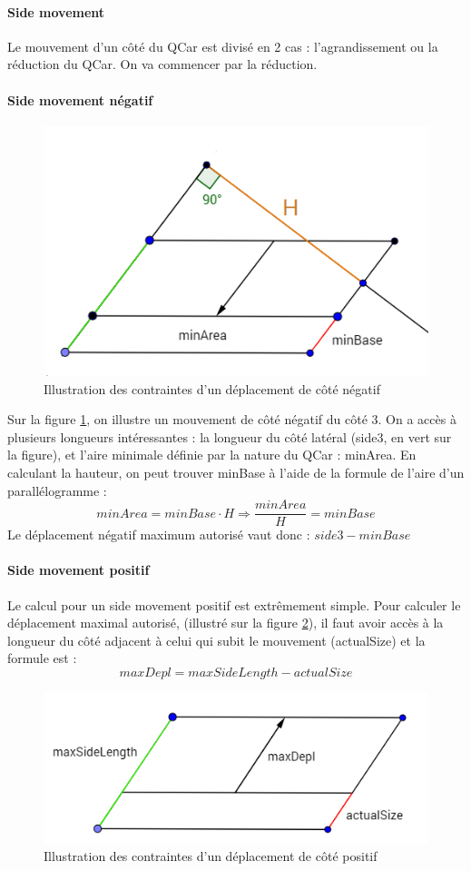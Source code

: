 \documentclass[a4paper, 12pt]{article}
\begin{document}
 \paragraph{Side movement} Le mouvement d'un côté du QCar est divisé en 2 cas : l'agrandissement  ou la réduction du QCar. On va commencer par la réduction. 
 \paragraph{Side movement négatif}
 \begin{figure}[h!]
\centering
\includegraphics[width=0.6\linewidth]{includes/images/QCar_reduc}
\caption{Illustration des contraintes d'un déplacement de côté négatif}
\label{fig:qcarreduc}
\end{figure}
Sur la figure \ref{fig:qcarreduc}, on illustre un mouvement de côté négatif du côté 3. On a accès à plusieurs longueurs intéressantes : la longueur du côté latéral (side3, en vert sur la figure), et l'aire minimale définie par la nature du QCar : minArea. En calculant la hauteur, on peut trouver minBase à l'aide de la formule de l'aire d'un parallélogramme :
\[minArea = minBase \cdot H  \Rightarrow \frac{minArea}{H} = minBase \]
Le déplacement négatif maximum autorisé vaut donc : $side3 - minBase$
\paragraph{Side movement positif} Le calcul pour un side movement positif est extrêmement simple. Pour calculer le déplacement maximal autorisé, (illustré sur la figure \ref{fig:qcaraugment}), il faut avoir accès à la longueur du côté adjacent à celui qui subit le mouvement (actualSize) et la formule est :\[maxDepl = maxSideLength - actualSize\]
\begin{figure}[h!]
\centering
\includegraphics[width=0.7\linewidth]{includes/images/QCar_augment}
\caption{Illustration des contraintes d'un déplacement de côté positif}
\label{fig:qcaraugment}
\end{figure}
\end{document}
